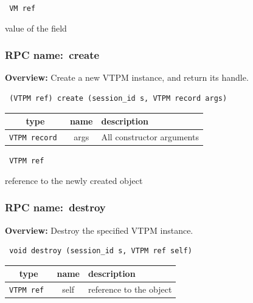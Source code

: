 \vspace{0.3cm}

{\tt 
VM ref
}


value of the field
\vspace{0.3cm}
\vspace{0.3cm}
\vspace{0.3cm}
\subsubsection{RPC name:~create}

{\bf Overview:} 
Create a new VTPM instance, and return its handle.

\begin{verbatim} (VTPM ref) create (session_id s, VTPM record args)\end{verbatim}



 
\vspace{0.3cm}
\begin{tabular}{|c|c|p{7cm}|}
 \hline
{\bf type} & {\bf name} & {\bf description} \\ \hline
{\tt VTPM record } & args & All constructor arguments \\ \hline 

\end{tabular}

\vspace{0.3cm}

{\tt 
VTPM ref
}


reference to the newly created object
\vspace{0.3cm}
\vspace{0.3cm}
\vspace{0.3cm}
\subsubsection{RPC name:~destroy}

{\bf Overview:} 
Destroy the specified VTPM instance.

\begin{verbatim} void destroy (session_id s, VTPM ref self)\end{verbatim}



 
\vspace{0.3cm}
\begin{tabular}{|c|c|p{7cm}|}
 \hline
{\bf type} & {\bf name} & {\bf description} \\ \hline
{\tt VTPM ref } & self & reference to the object \\ \hline 

\end{tabular}

